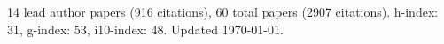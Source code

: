 14 lead author papers (916 citations),
60 total papers (2907 citations).\newline
h-index: 31, g-index: 53, i10-index: 48. Updated \today.